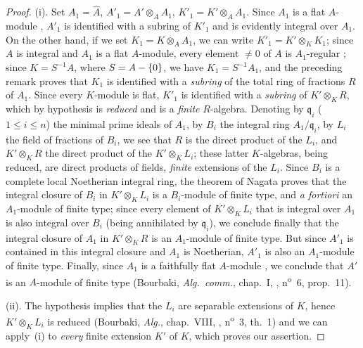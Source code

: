 \begin{proof}
\medskip\noindent
(i).
Set $A_1=\hat{A}$, $A'_1=A'\otimes_A A_1$, $K'_1=K'\otimes_A A_1$.
Since $A_1$ is a flat $A$-module , $A'_1$ is identified with a subring of $K'_1$ and is evidently integral over $A_1$.
On the other hand, if we set $K_1=K\otimes_A A_1$, we can write $K'_1=K'\otimes_K K_1$; since $A$ is integral and $A_1$ is a flat $A$-module, every element $\neq 0$ of $A$ is $A_1$-regular ; since $K=S^{-1}A$, where $S=A-\{0\}$, we have $K_1=S^{-1}A_1$, and the preceding remark proves that $K_1$ is identified with a \emph{subring} of the total ring of fractions $R$ of $A_1$.
Since every $K$-module is flat, $K'_1$ is identified with a \emph{subring} of $K'\otimes_K R$, which by hypothesis is \emph{reduced} and is a \emph{finite} $R$-algebra.
Denoting by $\mathfrak{q}_i$ ($1\leq i\leq n$) the minimal prime ideals of $A_1$, by $B_i$ the integral ring $A_1/\mathfrak{q}_i$, by $L_i$ the field of fractions of $B_i$, we see that $R$ is the direct product of the $L_i$, and $K'\otimes_K R$ the direct product of the $K'\otimes_K L_i$; these latter $K$-algebras, being reduced, are direct products of fields, \emph{finite} extensions of the $L_i$.
Since $B_i$ is a complete local Noetherian integral ring, the theorem of Nagata  proves that the integral closure of $B_i$ in $K'\otimes_K L_i$ is a $B_i$-module of finite type, and \emph{a fortiori} an $A_1$-module of finite type; since every element of $K'\otimes_K L_i$ that is integral over $A_1$ is also integral over $B_i$ (being annihilated by $\mathfrak{q}_i$), we conclude finally that the integral closure of $A_1$ in $K'\otimes_K R$ is an $A_1$-module of finite type.
But since $A'_1$ is contained in this integral closure and $A_1$ is Noetherian, $A'_1$ is also an $A_1$-module of finite type.
Finally, since $A_1$ is a faithfully flat $A$-module , we conclude that $A'$ is an $A$-module of finite type (Bourbaki, \emph{Alg.~comm.}, chap.~I, , n\textsuperscript{o}~6, prop.~11).

\medskip\noindent
{}
(ii).
The hypothesis implies that the $L_i$ are separable extensions of $K$, hence $K'\otimes_K L_i$ is reduced (Bourbaki, \emph{Alg.}, chap.~VIII, , n\textsuperscript{o}~3, th.~1) and we can apply~(i) to \emph{every} finite extension $K'$ of $K$, which proves our assertion.
\end{proof}

